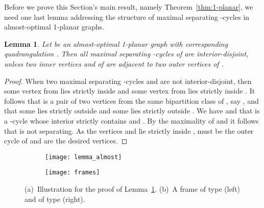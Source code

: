 \documentclass{article}
\newtheorem{lemma}[theorem]{Lemma}
\begin{document}
Before we prove this Section's main result, namely Theorem~\ref{thm:1-planar}, we need one last lemma addressing the structure of maximal separating -cycles in almost-optimal 1-planar graphs.


\begin{lemma}\label{lem:almost}
 Let  be an almost-optimal 1-planar graph with corresponding quadrangulation .
 Then all maximal separating -cycles of  are interior-disjoint, unless two inner vertices  and  of  are adjacent to two outer vertices of .
\end{lemma}
\begin{proof}
 When two maximal separating -cycles  and  are not interior-disjoint, then some vertex from  lies strictly inside  and some vertex from  lies strictly inside .
 It follows that  is a pair  of two vertices from the same bipartition class of , say , and that some  lies strictly outside  and some  lies strictly outside .
 We have  and that  is a -cycle whose interior strictly contains  and .
 By the maximality of  and  it follows that  is not separating.
 As the vertices  and  lie strictly inside ,  must be the outer cycle of  and  are the desired vertices.
\end{proof}

\begin{figure}[t]
\centering
  \begin{subfigure}[t]{.2\textwidth}
    \centering
    \texttt{[image: lemma\_almost]}
    \caption{}
    \label{fig:sep-pair-b}
  \end{subfigure}
  \hspace{3em}
  \begin{subfigure}[t]{.5\textwidth}
    \centering
    \texttt{[image: frames]}
    \caption{}
    \label{fig:frames}
  \end{subfigure}
  \caption{(a)~Illustration for the proof of Lemma~\ref{lem:almost}.
  (b)~A frame of type  (left) and of type  (right).}
\end{figure}
\end{document}
